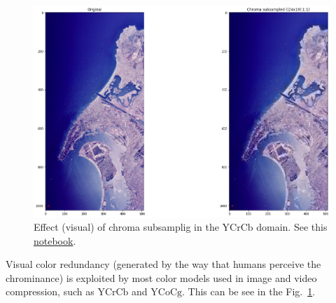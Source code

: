 \begin{figure}
  \centering
  \includegraphics{san-diego_chroma_subsampled}
  \caption{Effect (visual) of chroma subsamplig in the $\text{YCrCb}$ domain. See
    this
    \href{https://github.com/vicente-gonzalez-ruiz/visual_redundancy/blob/master/chroma_subsampling.ipynb}{notebook}.}
  \label{fig:san-diego_chroma_subsampled}
\end{figure}

Visual color redundancy (generated by the way that humans perceive the
chrominance) is exploited by most color models used in image and video
compression, such as $\text{YCrCb}$ and $\text{YCoCg}$. This can be
see in the Fig.~\ref{fig:san-diego_chroma_subsampled}.


